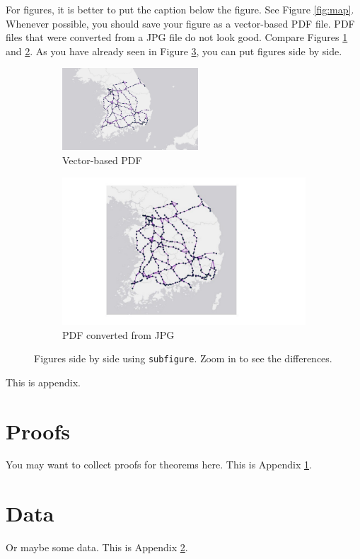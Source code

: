 \documentclass[letterpaper, 11pt]{article}
\begin{document}
For figures, it is better to put the caption below the figure. See Figure \ref{fig:map}. Whenever possible, you should save your figure as a vector-based PDF file. PDF files that were converted from a JPG file do not look good. Compare Figures \ref{fig:map-pdf} and \ref{fig:map-jpg}. As you have already seen in Figure \ref{fig:side-by-side}, you can put figures side by side.



\begin{figure} \centering
\begin{subfigure}[b]{0.4\textwidth}
\includegraphics[width=2in]{map}
\caption{Vector-based PDF}
\label{fig:map-pdf}
\end{subfigure}
%
\begin{subfigure}[b]{0.4\textwidth}
\includegraphics[width=4in]{map-jpg}
\caption{PDF converted from JPG}
\label{fig:map-jpg}
\end{subfigure}
\caption{Figures side by side using \texttt{subfigure}. Zoom in to see the differences.}
\label{fig:side-by-side}
\end{figure}









\newpage
\renewcommand{\appendixpagename}{Appendix}

\appendix
\appendixpage

This is appendix.

\section{Proofs} \label{appendix:proofs}

You may want to collect proofs for theorems here. This is Appendix \ref{appendix:proofs}.

\section{Data} \label{appendix:data}

Or maybe some data. This is Appendix \ref{appendix:data}.
\end{document}
